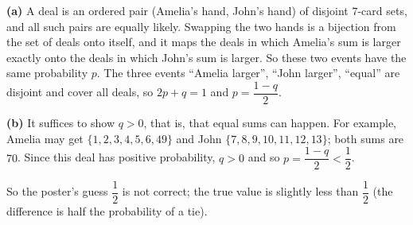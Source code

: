 \textbf{(a)} A deal is an ordered pair (Amelia's hand, John's hand) of disjoint $7$-card sets, and all such pairs are equally likely. Swapping the two hands is a bijection from the set of deals onto itself, and it maps the deals in which Amelia's sum is larger exactly onto the deals in which John's sum is larger. So these two events have the same probability $p$. The three events ``Amelia larger'', ``John larger'', ``equal'' are disjoint and cover all deals, so $2p+q=1$ and $p=\dfrac{1-q}{2}$.

\textbf{(b)} It suffices to show $q>0$, that is, that equal sums can happen. For example, Amelia may get $\{1,2,3,4,5,6,49\}$ and John $\{7,8,9,10,11,12,13\}$; both sums are $70$. Since this deal has positive probability, $q>0$ and so $p=\dfrac{1-q}{2}<\dfrac{1}{2}$.

So the poster's guess $\dfrac{1}{2}$ is not correct; the true value is slightly less than $\dfrac{1}{2}$ (the difference is half the probability of a tie).
